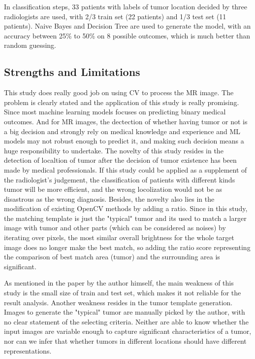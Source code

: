 \documentclass[twoside,11pt]{article}
\begin{document}
In classification steps, 33 patients with labels of tumor location decided by three radiologists are used, with 2/3 train set (22 patients) and 1/3 test set (11 patients). Naive Bayes and Decision Tree are used to generate the model, with an accuracy between 25\% to 50\% on 8 possible outcomes, which is much better than random guessing.

\subsection{Strengths and Limitations}
This study does really good job on using CV to process the MR image. The problem is clearly stated and the application of this study is really promising. Since most machine learning models focuses on predicting binary medical outcomes. And for MR images, the dectection of whether having tumor or not is a big decision and strongly rely on medical knowledge and experience and ML models may not robust enough to predict it, and making such decision means a huge responsibility to undertake. The novelty of this study resides in the detection of localtion of tumor after the decision of tumor existence has been made by medical professionals. If this study could be applied as a supplement of the radiologist's judgement, the classification of patients with different kinds tumor will be more efficient, and the wrong locolization would not be as disastrous as the wrong diagnosis. Besides, the novelty also lies in the modification of existing OpenCV methods by adding a ratio. Since in this study, the matching template is just the "typical" tumor and its used to match a larger image with tumor and other parts (which can be considered as noises) by iterating over pixels, the most similar overall brightness for the whole target image does no longer make the best match, so adding the ratio score representing the comparison of best match area (tumor) and the surrounding area is significant.

As mentioned in the paper by the author himself, the main weakness of this study is the small size of train and test set, which makes it not reliable for the result analysis. Another weakness resides in the tumor template generation. Images to generate the "typical" tumor are manually picked by the author, with no clear statement of the selecting criteria. Neither are able to know whether the input images are variable enough to capture significant characteristics of a tumor, nor can we infer that whether tumors in different locations should have different representations.
\end{document}
